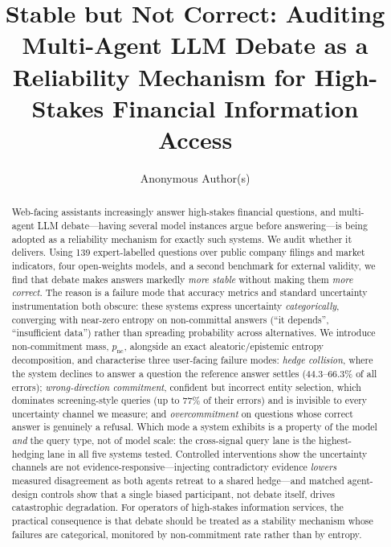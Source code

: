 \documentclass[sigconf,anonymous,review]{acmart}
\begin{document}
\title{Stable but Not Correct: Auditing Multi-Agent LLM Debate as a
Reliability Mechanism for High-Stakes Financial Information Access}

\author{Anonymous Author(s)}

\begin{abstract}
Web-facing assistants increasingly answer high-stakes financial questions,
and multi-agent LLM debate---having several model instances argue before
answering---is being adopted as a reliability mechanism for exactly such
systems. We audit whether it delivers. Using 139 expert-labelled questions
over public company filings and market indicators, four open-weights models,
and a second benchmark for external validity, we find that debate makes
answers markedly \emph{more stable} without making them \emph{more correct}.
The reason is a failure mode that accuracy metrics and standard uncertainty
instrumentation both obscure: these systems express uncertainty
\emph{categorically}, converging with near-zero entropy on non-committal
answers (``it depends'', ``insufficient data'') rather than spreading
probability across alternatives. We introduce non-commitment mass,
$p_{\mathrm{nc}}$, alongside an exact aleatoric/epistemic entropy
decomposition, and characterise three user-facing failure modes:
\emph{hedge collision}, where the system declines to answer a question the
reference answer settles ($44.3$--$66.3\%$ of all errors); \emph{wrong-direction
commitment}, confident but incorrect entity selection, which dominates
screening-style queries (up to $77\%$ of their errors) and is invisible to every
uncertainty channel we measure; and \emph{overcommitment} on questions whose
correct answer is genuinely a refusal. Which mode a system exhibits is a
property of the model \emph{and} the query type, not of model scale: the
cross-signal query lane is the highest-hedging lane in all five systems
tested. Controlled interventions show the uncertainty channels are not
evidence-responsive---injecting contradictory evidence \emph{lowers} measured
disagreement as both agents retreat to a shared hedge---and matched
agent-design controls show that a single biased participant, not debate
itself, drives catastrophic degradation. For operators of high-stakes
information services, the practical consequence is that debate should be
treated as a stability mechanism whose failures are categorical, monitored
by non-commitment rate rather than by entropy.
\end{abstract}
\end{document}

